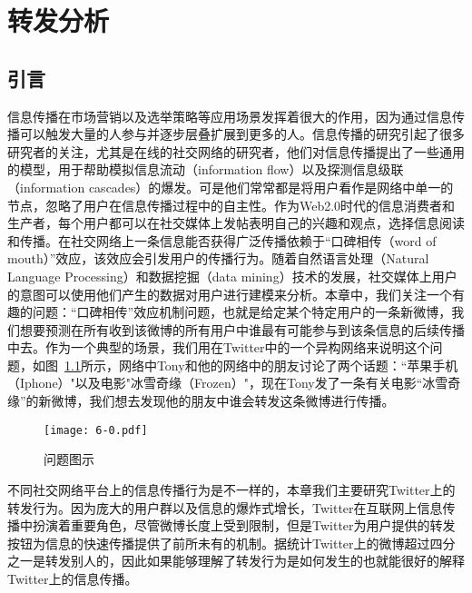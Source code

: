\chapter{转发分析}
\label{ch6}

\section{引言}
\label{ch6_intro}
信息传播在市场营销以及选举策略等应用场景发挥着很大的作用，因为通过信息传播可以触发大量的人参与并逐步层叠扩展到更多的人。信息传播的研究引起了很多研究者的关注，尤其是在线的社交网络的研究者，他们对信息传播提出了一些通用的模型，用于帮助模拟信息流动（information flow）以及探测信息级联（information cascades）的爆发。可是他们常常都是将用户看作是网络中单一的节点，忽略了用户在信息传播过程中的自主性。作为Web2.0时代的信息消费者和生产者，每个用户都可以在社交媒体上发帖表明自己的兴趣和观点，选择信息阅读和传播。在社交网络上一条信息能否获得广泛传播依赖于“口碑相传（word of mouth）”效应，该效应会引发用户的传播行为。随着自然语言处理（Natural Language Processing）和数据挖掘（data mining）技术的发展，社交媒体上用户的意图可以使用他们产生的数据对用户进行建模来分析。本章中，我们关注一个有趣的问题：“口碑相传”效应机制问题，也就是给定某个特定用户的一条新微博，我们想要预测在所有收到该微博的所有用户中谁最有可能参与到该条信息的后续传播中去。作为一个典型的场景，我们用在Twitter中的一个异构网络来说明这个问题，如图~\ref{fig6-0}所示，网络中Tony和他的网络中的朋友讨论了两个话题：“苹果手机（Iphone）"以及电影"冰雪奇缘（Frozen）"，现在Tony发了一条有关电影“冰雪奇缘”的新微博，我们想去发现他的朋友中谁会转发这条微博进行传播。

\begin{figure}[htb]
\centering
\texttt{[image: 6-0.pdf]}
\caption{问题图示}
\label{fig6-0}
\end{figure}

不同社交网络平台上的信息传播行为是不一样的，本章我们主要研究Twitter上的转发行为。因为庞大的用户群以及信息的爆炸式增长，Twitter在互联网上信息传播中扮演着重要角色，尽管微博长度上受到限制，但是Twitter为用户提供的转发按钮为信息的快速传播提供了前所未有的机制。据统计Twitter上的微博超过四分之一是转发别人的，因此如果能够理解了转发行为是如何发生的也就能很好的解释Twitter上的信息传播。

